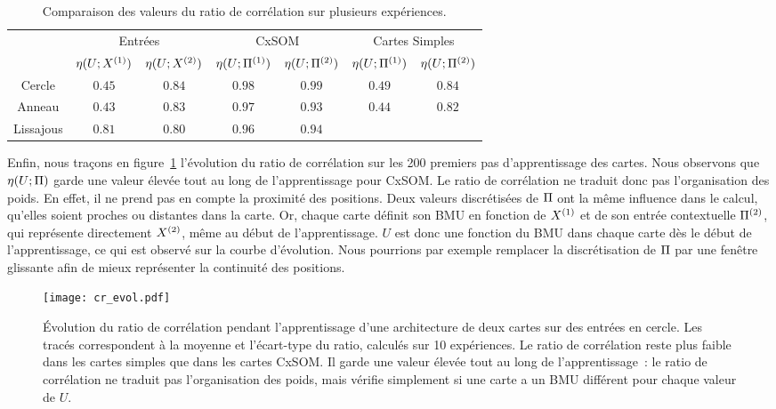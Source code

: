 \documentclass[../main]{subfiles}
\begin{document}
\begin{table}
    \centering
    \caption{Comparaison des valeurs du ratio de corrélation sur plusieurs expériences.\label{tab:eta}}
    \begin{tabular}{*7c}
        \toprule
        & \multicolumn{2}{c}{Entrées} & \multicolumn{2}{c}{CxSOM} & \multicolumn{2}{c}{Cartes Simples} \\
        \cmidrule(lr){2-7}
         & $\eta(U;X^{({1})})$ & $\eta(U;X^{({2})})$  & $\eta(U;\Pi^{({1})})$ & $\eta(U;\Pi^{({2})})$  & $\eta(U;\Pi^{({1})})$ & $\eta(U;\Pi^{({2})})$ \\    
        \midrule
        Cercle &   $0.45 $    & $0.84$  &  $0.98$ & $0.99$ & $0.49$ & $0.84$      \\
        Anneau &  $0.43$      &  $0.83$      & $0.97$ & $0.93$ & $0.44$ & $0.82$ \\
        Lissajous &  $0.81$     &  $0.80$ & $0.96$ & $0.94$  & & \\
        \bottomrule
    \end{tabular}
\end{table}

Enfin, nous traçons en figure~\ref{fig:cr_evol} l'évolution du ratio de corrélation sur les 200 premiers pas d'apprentissage des cartes. 
Nous observons que $\eta(U;\Pi)$ garde une valeur élevée tout au long de l'apprentissage pour CxSOM.
Le ratio de corrélation ne traduit donc pas l'organisation des poids.
En effet, il ne prend pas en compte la proximité des positions. Deux valeurs discrétisées de $\Pi$ ont la même influence dans le calcul, qu'elles soient proches ou distantes dans la carte.
Or, chaque carte définit son BMU en fonction de $X^{({1})}$ et de son entrée contextuelle $\Pi^{({2})}$, qui représente directement $X^{({2})}$, même au début de l'apprentissage. $U$ est donc une fonction du BMU dans chaque carte dès le début de l'apprentissage, ce qui est observé sur la courbe d'évolution.
Nous pourrions par exemple remplacer la discrétisation de $\Pi$ par une fenêtre glissante afin de mieux représenter la continuité des positions.

\begin{figure}
    \texttt{[image: cr\_evol.pdf]}
    \caption{\'Evolution du ratio de corrélation pendant l'apprentissage d'une architecture de deux cartes sur des entrées en cercle. Les tracés correspondent à la moyenne et l'écart-type du ratio, calculés sur 10 expériences. Le ratio de corrélation reste plus faible dans les cartes simples que dans les cartes CxSOM. Il garde une valeur élevée tout au long de l'apprentissage~: le ratio de corrélation ne traduit pas l'organisation des poids, mais vérifie simplement si une carte a un BMU différent pour chaque valeur de $U$. \label{fig:cr_evol}}
\end{figure}
\end{document}
